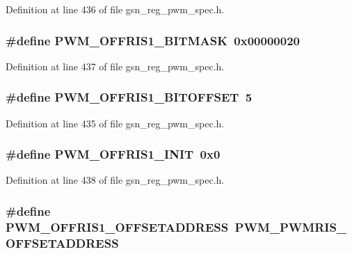 Definition at line 436 of file gsn\_\-reg\_\-pwm\_\-spec.h.

\hypertarget{a00565_a557cb447f85354a11c7e11dacb5969f9}{
\subsubsection[{PWM\_\-OFFRIS1\_\-BITMASK}]{\setlength{\rightskip}{0pt plus 5cm}\#define PWM\_\-OFFRIS1\_\-BITMASK~0x00000020}}
\label{a00565_a557cb447f85354a11c7e11dacb5969f9}


Definition at line 437 of file gsn\_\-reg\_\-pwm\_\-spec.h.

\hypertarget{a00565_af934a7197671bee73fc9acba848e4d94}{
\subsubsection[{PWM\_\-OFFRIS1\_\-BITOFFSET}]{\setlength{\rightskip}{0pt plus 5cm}\#define PWM\_\-OFFRIS1\_\-BITOFFSET~5}}
\label{a00565_af934a7197671bee73fc9acba848e4d94}


Definition at line 435 of file gsn\_\-reg\_\-pwm\_\-spec.h.

\hypertarget{a00565_a5d41f39e164eb3d27dbbd432e35c3233}{
\subsubsection[{PWM\_\-OFFRIS1\_\-INIT}]{\setlength{\rightskip}{0pt plus 5cm}\#define PWM\_\-OFFRIS1\_\-INIT~0x0}}
\label{a00565_a5d41f39e164eb3d27dbbd432e35c3233}


Definition at line 438 of file gsn\_\-reg\_\-pwm\_\-spec.h.

\hypertarget{a00565_aa0011d709ada1c8cb3b221053cdcd3ad}{
\subsubsection[{PWM\_\-OFFRIS1\_\-OFFSETADDRESS}]{\setlength{\rightskip}{0pt plus 5cm}\#define PWM\_\-OFFRIS1\_\-OFFSETADDRESS~PWM\_\-PWMRIS\_\-OFFSETADDRESS}}
\label{a00565_aa0011d709ada1c8cb3b221053cdcd3ad}


